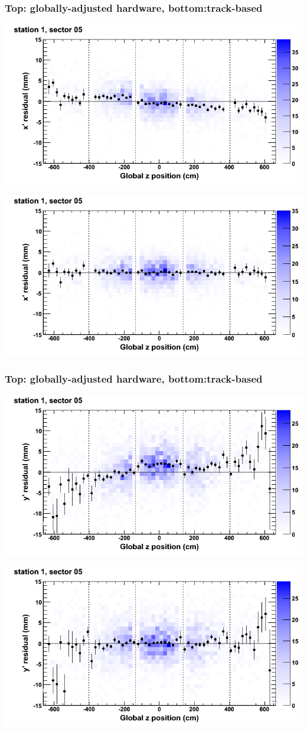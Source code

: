 \documentclass[compress]{beamer}
\begin{document}
\begin{frame}
\frametitle{Top: globally-adjusted hardware, bottom:track-based}
\includegraphics[width=0.7\linewidth]{NOV4_mapplots_HW/DTvsz_st1sec05_x.png}

\includegraphics[width=0.7\linewidth]{NOV4_mapplots/DTvsz_st1sec05_x.png}
\end{frame}

\begin{frame}
\frametitle{Top: globally-adjusted hardware, bottom:track-based}
\includegraphics[width=0.7\linewidth]{NOV4_mapplots_HW/DTvsz_st1sec05_y.png}

\includegraphics[width=0.7\linewidth]{NOV4_mapplots/DTvsz_st1sec05_y.png}
\end{frame}
\end{document}
